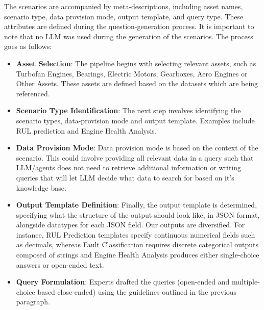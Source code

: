 \documentclass[sigconf]{acmart}
\begin{document}
The scenarios are accompanied by meta-descriptions, including asset names, scenario type, data provision mode, output template, and query type. These attributes are defined during the question-generation process. It is important to note that no LLM was used during the generation of the scenarios. The process goes as follows:
\begin{itemize}
    \item \textbf{Asset Selection}: The pipeline begins with selecting relevant assets, such as Turbofan Engines, Bearings, Electric Motors, Gearboxes, Aero Engines or Other Assets. These assets are defined based on the datasets which are being referenced.
    \item \textbf{Scenario Type Identification}: The next step involves identifying the scenario types, data-provision mode and output template. Examples include RUL prediction and Engine Health Analysis.
    \item \textbf{Data Provision Mode}: Data provision mode is based on the context of the scenario. This could involve providing all relevant data in a query such that LLM/agents does not need to retrieve additional information or writing queries that will let LLM decide what data to search for based on it's knowledge base.
    \item \textbf{Output Template Definition}: Finally, the output template is determined, specifying what the structure of the output should look like, in JSON format, alongside datatypes for each JSON field. Our outputs are diversified. For instance, RUL Prediction templates specify continuous numerical fields such as decimals, whereas Fault Classification requires discrete categorical outputs composed of strings and Engine Health Analysis produces either single-choice answers or open-ended text.
    \item \textbf{Query Formulation}: Experts drafted the queries (open-ended and multiple-choice based close-ended) using the guidelines outlined in the previous paragraph.
\end{itemize}


\end{document}
